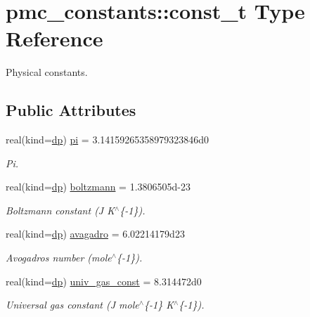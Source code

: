 \hypertarget{structpmc__constants_1_1const__t}{}\section{pmc\+\_\+constants\+:\+:const\+\_\+t Type Reference}
\label{structpmc__constants_1_1const__t}


Physical constants.  


\subsection*{Public Attributes}
\begin{DoxyCompactItemize}
\item 
real(kind=\mbox{\hyperlink{namespacepmc__constants_a396b7709ed4da67dac74cb46a1466ed6}{dp}}) \mbox{\hyperlink{structpmc__constants_1_1const__t_a1e0c76a6a3ef6fce9fed5ffc94a11704}{pi}} = 3.\+14159265358979323846d0
\begin{DoxyCompactList}\small\item\em Pi. \end{DoxyCompactList}\item 
real(kind=\mbox{\hyperlink{namespacepmc__constants_a396b7709ed4da67dac74cb46a1466ed6}{dp}}) \mbox{\hyperlink{structpmc__constants_1_1const__t_a2d0feb5a0982744ac1c52ebc7b231d1b}{boltzmann}} = 1.\+3806505d-\/23
\begin{DoxyCompactList}\small\item\em Boltzmann constant (J K$^\wedge$\{-\/1\}). \end{DoxyCompactList}\item 
real(kind=\mbox{\hyperlink{namespacepmc__constants_a396b7709ed4da67dac74cb46a1466ed6}{dp}}) \mbox{\hyperlink{structpmc__constants_1_1const__t_af10ee95442504c5d0e68b93c724c19e8}{avagadro}} = 6.\+02214179d23
\begin{DoxyCompactList}\small\item\em Avogadro\textquotesingle{}s number (mole$^\wedge$\{-\/1\}). \end{DoxyCompactList}\item 
real(kind=\mbox{\hyperlink{namespacepmc__constants_a396b7709ed4da67dac74cb46a1466ed6}{dp}}) \mbox{\hyperlink{structpmc__constants_1_1const__t_aad25c308d3b20d775d485fe11cbcaffe}{univ\+\_\+gas\+\_\+const}} = 8.\+314472d0
\begin{DoxyCompactList}\small\item\em Universal gas constant (J mole$^\wedge$\{-\/1\} K$^\wedge$\{-\/1\}). \end{DoxyCompactList}\item 

\end{DoxyCompactItemize}

